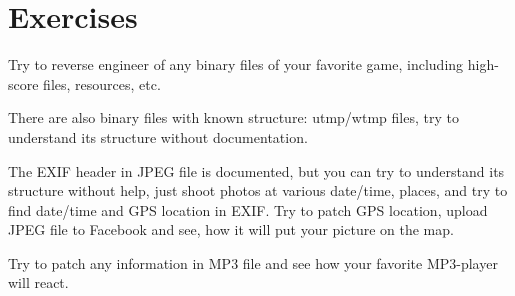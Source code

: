 \section{Exercises}

Try to reverse engineer of any binary files of your favorite game, including high-score files, resources, etc.

There are also binary files with known structure: utmp/wtmp files, try to understand its structure without documentation.

The EXIF header in JPEG file is documented, but you can try to understand its structure without help, just shoot photos
at various date/time, places, and try to find date/time and GPS location in EXIF.
Try to patch GPS location, upload JPEG file to Facebook and see, how it will put your picture on the map.

Try to patch any information in MP3 file and see how your favorite MP3-player will react.
